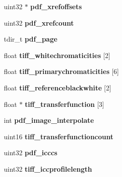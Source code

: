 \begin{DoxyCompactItemize}
\item 
\hypertarget{struct_t2_p_ada20d7c3a596f17a75c3fde1a0e825c8}{}uint32 $\ast$ {\bfseries pdf\+\_\+xrefoffsets}\label{struct_t2_p_ada20d7c3a596f17a75c3fde1a0e825c8}

\item 
\hypertarget{struct_t2_p_a9c9cfe5e902b5cf1d4ffe48dc5fc074e}{}uint32 {\bfseries pdf\+\_\+xrefcount}\label{struct_t2_p_a9c9cfe5e902b5cf1d4ffe48dc5fc074e}

\item 
\hypertarget{struct_t2_p_a7c3e76c4b6960e4e628fb7ff3db663ee}{}tdir\+\_\+t {\bfseries pdf\+\_\+page}\label{struct_t2_p_a7c3e76c4b6960e4e628fb7ff3db663ee}

\item 
\hypertarget{struct_t2_p_a19954a6e0a084853688a7a3b8de2e74a}{}float {\bfseries tiff\+\_\+whitechromaticities} \mbox{[}2\mbox{]}\label{struct_t2_p_a19954a6e0a084853688a7a3b8de2e74a}

\item 
\hypertarget{struct_t2_p_a04177188f460be3130b681eec79443fc}{}float {\bfseries tiff\+\_\+primarychromaticities} \mbox{[}6\mbox{]}\label{struct_t2_p_a04177188f460be3130b681eec79443fc}

\item 
\hypertarget{struct_t2_p_a830798619696af32a814ead0aada26e4}{}float {\bfseries tiff\+\_\+referenceblackwhite} \mbox{[}2\mbox{]}\label{struct_t2_p_a830798619696af32a814ead0aada26e4}

\item 
\hypertarget{struct_t2_p_af1410eced7eb8dc0379205221ef0ddb3}{}float $\ast$ {\bfseries tiff\+\_\+transferfunction} \mbox{[}3\mbox{]}\label{struct_t2_p_af1410eced7eb8dc0379205221ef0ddb3}

\item 
\hypertarget{struct_t2_p_a46ed10cc6c19ec94f8504fe91a72e702}{}int {\bfseries pdf\+\_\+image\+\_\+interpolate}\label{struct_t2_p_a46ed10cc6c19ec94f8504fe91a72e702}

\item 
\hypertarget{struct_t2_p_aff9f450b71c3f857a4ed2ada36a6a18f}{}uint16 {\bfseries tiff\+\_\+transferfunctioncount}\label{struct_t2_p_aff9f450b71c3f857a4ed2ada36a6a18f}

\item 
\hypertarget{struct_t2_p_a267c8b8bbb26114422d16cdc9db94c59}{}uint32 {\bfseries pdf\+\_\+icccs}\label{struct_t2_p_a267c8b8bbb26114422d16cdc9db94c59}

\item 
\hypertarget{struct_t2_p_a5b93ed2fdc690bd368e736de278df226}{}uint32 {\bfseries tiff\+\_\+iccprofilelength}\label{struct_t2_p_a5b93ed2fdc690bd368e736de278df226}


\end{DoxyCompactItemize}
